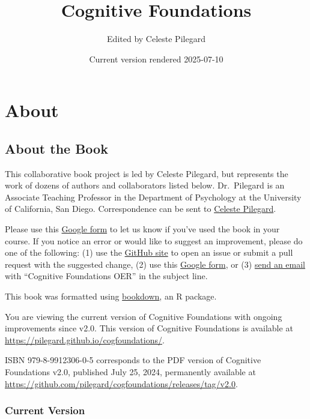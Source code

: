 \documentclass[
]{krantz}
\title{Cognitive Foundations}
\author{Edited by Celeste Pilegard}
\date{Current version rendered 2025-07-10}
\makeatletter
\newcommand*\pandocbounded[1]{%
  \sbox\pandoc@box{#1}%
  \Gscale@div\@tempa{\textheight}{\dimexpr\ht\pandoc@box+\dp\pandoc@box\relax}%
  \Gscale@div\@tempb{\linewidth}{\wd\pandoc@box}%
  \ifdim\@tempb\p@<\@tempa\p@\let\@tempa\@tempb\fi%
  \ifdim\@tempa\p@<\p@\scalebox{\@tempa}{\usebox\pandoc@box}%
  \else\usebox{\pandoc@box}%
  \fi%
}
\makeatother
\begin{document}
\maketitle

{
\setcounter{tocdepth}{1}
\tableofcontents
}
\chapter*{About}\label{about}


\pandocbounded{\texttt{[image: images/cover.png]}}

\section*{About the Book}\label{about-the-book}


This collaborative book project is led by Celeste Pilegard, but represents the work of dozens of authors and collaborators listed below. Dr.~Pilegard is an Associate Teaching Professor in the Department of Psychology at the University of California, San Diego. Correspondence can be sent to \href{mailto:pilegard@ucsd.edu}{Celeste Pilegard}.

Please use this \href{https://forms.gle/83CBvAgLuJshRfz37}{Google form} to let us know if you've used the book in your course. If you notice an error or would like to suggest an improvement, please do one of the following: (1) use the \href{https://github.com/pilegard/cogfoundations}{GitHub site} to open an issue or submit a pull request with the suggested change, (2) use this \href{https://forms.gle/83CBvAgLuJshRfz37}{Google form}, or (3) \href{mailto:pilegard@ucsd.edu}{send an email} with ``Cognitive Foundations OER'' in the subject line.

This book was formatted using \href{https://bookdown.org/}{bookdown}, an R package.

You are viewing the current version of Cognitive Foundations with ongoing improvements since v2.0. This version of Cognitive Foundations is available at \url{https://pilegard.github.io/cogfoundations/}.

ISBN 979-8-9912306-0-5 corresponds to the PDF version of Cognitive Foundations v2.0, published July 25, 2024, permanently available at \url{https://github.com/pilegard/cogfoundations/releases/tag/v2.0}.

\subsection*{Current Version}\label{current-version}
\end{document}
